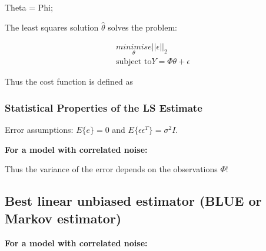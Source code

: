 \documentclass[10pt,a4paper]{scrartcl}
\begin{document}
\begin{multicols*}{2}
\begin{TPMatlab}
Theta = Phi\Y;
\end{TPMatlab}

The least squares solution $\hat{\theta}$ solves the problem:

\begin{align*}
\underset{\theta}{minimise} ||\epsilon||_2\\
\text{subject to} Y=\Phi\theta +\epsilon
\end{align*}

Thus the cost function is defined as


\subsubsection{Statistical Properties of the LS Estimate}


Error assumptions: $E\{e\} = 0$ and $E\{\epsilon\epsilon^T\} = \sigma^2 I$.



\textbf{For a model with correlated noise:}




Thus the variance of the error depends on the observations $\Phi$!

\subsection{Best linear unbiased estimator (BLUE or Markov estimator)}

\textbf{For a model with correlated noise:}



\end{multicols*}
\end{document}
